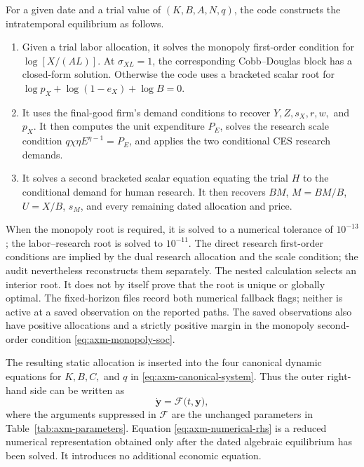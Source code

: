 For a given date and a trial value of \((K,B,A,N,q)\), the code constructs the
intratemporal equilibrium as follows.
\begin{enumerate}[label=\textbf{\arabic*.},leftmargin=*]
 \item Given a trial labor allocation, it solves the monopoly first-order
 condition for \(\log[X/(AL)]\). At \(\sigma_{XL}=1\), the corresponding
 Cobb--Douglas block has a closed-form solution. Otherwise the code uses a
 bracketed scalar root for
 \(\log p_X+\log(1-e_X)+\log B=0\).
 \item It uses the final-good firm's demand conditions to recover \(Y,Z,s_X,r,w,\)
 and \(p_X\). It then computes the unit expenditure \(P_E\), solves the research
 scale condition \(q\chi\eta E^{\eta-1}=P_E\), and applies the two conditional
 CES research demands.
 \item It solves a second bracketed scalar equation equating the trial \(H\) to
 the conditional demand for human research. It then recovers \(BM\),
 \(M=BM/B\), \(U=X/B\), \(s_M\), and every remaining dated allocation and price.
\end{enumerate}
When the monopoly root is required, it is solved to a numerical tolerance of
\(10^{-13}\); the labor--research root is solved to \(10^{-11}\). The direct research first-order conditions
are implied by the dual research allocation and the scale condition; the audit
nevertheless reconstructs them separately. The nested calculation selects an
interior root. It does not by itself prove that the root is unique or globally
optimal. The fixed-horizon files record both numerical fallback flags; neither is
active at a saved observation on the reported paths. The saved observations also
have positive allocations and a strictly positive margin in the monopoly
second-order condition \eqref{eq:axm-monopoly-soc}.

The resulting static allocation is inserted into the four canonical dynamic equations for
\(K,B,C,\) and \(q\) in \eqref{eq:axm-canonical-system}. Thus the outer right-hand
side can be written as
\begin{equation}
 \dot{\mathbf y}=\mathcal F\bigl(t,\mathbf y\bigr),
 \label{eq:axm-numerical-rhs}
\end{equation}
where the arguments suppressed in \(\mathcal F\) are the unchanged parameters in
Table~\ref{tab:axm-parameters}. Equation \eqref{eq:axm-numerical-rhs} is a
reduced numerical representation obtained only after the dated algebraic
equilibrium has been solved. It introduces no additional economic equation.

